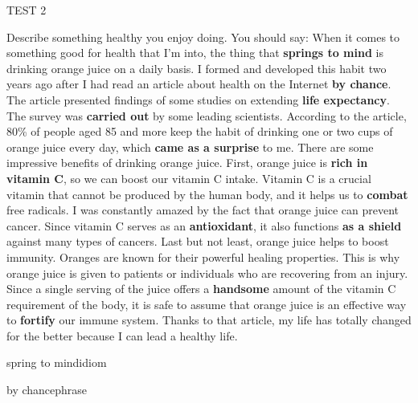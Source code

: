 \begin{glossarymc}[Cambridge 6]
\begin{test}{TEST 2}
\begin{qa}{Describe something healthy you enjoy doing. You should say:}
    When it comes to something good for health that I'm into, the thing that \textbf{springs to mind} is drinking orange juice on a daily basis. I formed and developed this habit two years ago after I had read an article about health on the Internet \textbf{by chance}. The article presented findings of some studies on extending \textbf{life expectancy}. The survey was \textbf{carried out} by some leading scientists. According to the article, 80\% of people aged 85 and more keep the habit of drinking one or two cups of orange juice every day, which \textbf{came as a surprise} to me. There are some impressive benefits of drinking orange juice. First, orange juice is \textbf{rich in vitamin C}, so we can boost our vitamin C intake. Vitamin C is a crucial vitamin that cannot be produced by the human body, and it helps us to \textbf{combat} free radicals. I was constantly amazed by the fact that orange juice can prevent cancer. Since vitamin C serves as an \textbf{antioxidant}, it also functions \textbf{as a shield} against many types of cancers. Last but not least, orange juice helps to boost immunity. Oranges are known for their powerful healing properties. This is why orange juice is given to patients or individuals who are recovering from an injury. Since a single serving of the juice offers a \textbf{handsome} amount of the vitamin C requirement of the body, it is safe to assume that orange juice is an effective way to \textbf{fortify} our immune system. Thanks to that article, my life has totally changed for the better because I can lead a healthy life.
    \end{qa}

        \begin{VocabExplain}[Part 2]
            \begin{ExplainCard}{spring to mind}{idiom}
            \end{ExplainCard}

        \begin{ExplainCard}{by chance}{phrase}
        \end{ExplainCard}


\end{VocabExplain}
\end{test}
\end{glossarymc}
